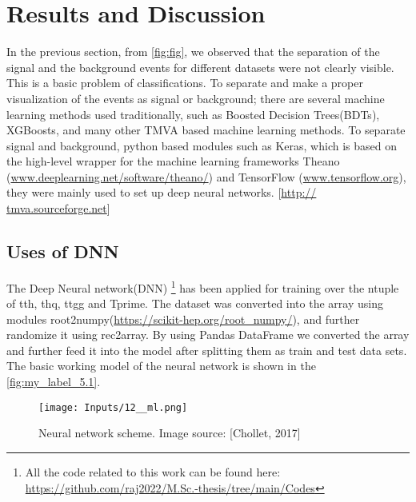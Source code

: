 \chapter{\label{results}Results and Discussion}
In the previous section, from \autoref{fig:fig}, we observed that the separation of the signal and the background events for different datasets were not clearly visible. This is a basic problem of classifications. To separate and make a proper visualization of the events as signal or background; there are several machine learning methods used traditionally, such as Boosted Decision Trees(BDTs), XGBoosts, and many other TMVA based machine learning methods. To separate signal and background, python based  modules such as Keras, which is based on the high-level wrapper for the machine learning frameworks Theano (\url{www.deeplearning.net/software/theano/}) and TensorFlow (\url{www.tensorflow.org}), they were mainly used to set up deep neural networks.\cite{29} \cite{30}
[\url{http:// tmva.sourceforge.net}]



\section{Uses of DNN }
The Deep Neural network(DNN) \footnote{All the code related to this work can be found here: \url{https://github.com/raj2022/M.Sc.-thesis/tree/main/Codes}} has been applied for training over the ntuple of tth, thq, ttgg and Tprime. The dataset was converted into the array using modules root2numpy(\url{https://scikit-hep.org/root_numpy/}), and further randomize it using rec2array. By using Pandas DataFrame we converted the array and further feed it into the model after splitting them as train and test data sets. The basic working model of the neural network is shown in the \autoref{fig:my_label_5.1}.
\begin{figure}[H]
    \centering
    \texttt{[image: Inputs/12\_\_ml.png]}
    \caption{Neural network scheme. Image source: [Chollet, 2017]}
    \label{fig:my_label_5.1}
\end{figure}

